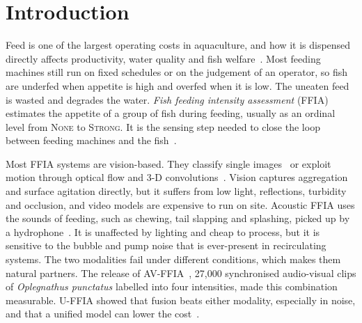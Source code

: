 \section{Introduction}
\label{sec:intro}

Feed is one of the largest operating costs in aquaculture, and how it is dispensed directly affects
productivity, water quality and fish welfare~\cite{atoum2014feeding,yang2021smartfish}. Most feeding
machines still run on fixed schedules or on the judgement of an operator, so fish are underfed when
appetite is high and overfed when it is low. The uneaten feed is wasted and degrades the water.
\emph{Fish feeding intensity assessment} (FFIA) estimates the appetite of a group of fish during feeding,
usually as an ordinal level from \textsc{None} to \textsc{Strong}. It is the sensing step needed to close
the loop between feeding machines and the fish~\cite{an2021behaviour,zhou2019ffia}.

Most FFIA systems are vision-based. They classify single images~\cite{zhou2019ffia,yang2021effnetb2,zhang2023msif}
or exploit motion through optical flow and 3-D convolutions~\cite{ubina2021ffia}. Vision captures
aggregation and surface agitation directly, but it suffers from low light, reflections, turbidity
and occlusion, and video models are expensive to run on site. Acoustic FFIA uses the sounds of feeding,
such as chewing, tail slapping and splashing, picked up by a hydrophone~\cite{cui2022affia3k}. It is
unaffected by lighting and cheap to process, but it is sensitive to the bubble and pump noise that is
ever-present in recirculating systems. The two modalities fail under different conditions, which
makes them natural partners. The release of AV-FFIA~\cite{cui2024uffia}, 27,000 synchronised
audio-visual clips of \textit{Oplegnathus punctatus} labelled into four intensities, made this
combination measurable. U-FFIA showed that fusion beats either modality, especially in noise, and
that a unified model can lower the cost~\cite{cui2024uffia}.

